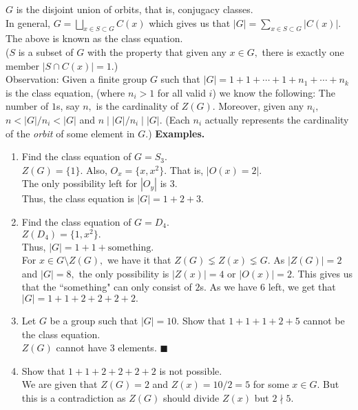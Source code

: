 \documentclass[12 pt, a4paper, toc=graduated, oneside]{article}
\theoremstyle{definition}
\begin{document}
$G$ is the disjoint union of orbits, that is, conjugacy classes.\\
In general, $G = \displaystyle\bigsqcup_{x \in S \subset G}C(x)$ which gives us that $|G| = \displaystyle\sum_{x\in S\subset G}|C(x)|.$\\
The above is known as the class equation.\\
($S$ is a subset of $G$ with the property that given any $x\in G,$ there is exactly one member $|S\cap C(x)| = 1.$)\\
Observation: Given a finite group $G$ such that $|G| = 1 + 1 + \cdots + 1 + n_1 + \cdots + n_k$ is the class equation, (where $n_i > 1$ for all valid $i$) we know the following: The number of $1$s, say $n,$ is the cardinality of $Z(G).$ Moreover, given any $n_i,$ $n < |G|/n_i < |G|$ and $n \mid |G|/n_i \mid |G|.$ (Each $n_i$ actually represents the cardinality of the \emph{orbit} of some element in $G.$)
\textbf{Examples.}
\begin{enumerate} 
	\item Find the class equation of $G = S_3.$\\
	$Z(G) = \{1\}.$ Also, $O_x = \{x, x^2\}.$ That is, $|O(x) = 2|.$\\
	The only possibility left for $|O_y|$ is $3.$\\
	Thus, the class equation is $|G| = 1 + 2 + 3.$
	\item Find the class equation of $G = D_4.$\\
	$Z(D_4) = \{1, x^2\}.$\\
	Thus, $|G| = 1 + 1 + \text{something}.$\\
	For $x \in G\setminus Z(G),$ we have it that $Z(G) \lneq Z(x) \lneq G.$ As $|Z(G)| = 2$ and $|G| = 8,$ the only possibility is $|Z(x)| = 4$ or $|O(x)| = 2.$ This gives us that the ``something" can only consist of $2$s. As we have $6$ left, we get that $|G| = 1 + 1 + 2 + 2 + 2 + 2.$
	\item Let $G$ be a group such that $|G| = 10.$ Show that $1 + 1 + 1 + 2 + 5$ cannot be the class equation.\\
	$Z(G)$ cannot have 3 elements. \hfill $\blacksquare$
	\item Show that $1 + 1 + 2 + 2 + 2 + 2$ is not possible.\\
	We are given that $Z(G) = 2$ and $Z(x) = 10/2 = 5$ for some $x \in G.$ But this is a contradiction as $Z(G)$ should divide $Z(x)$ but $2 \nmid 5.$
\end{enumerate}
\end{document}
